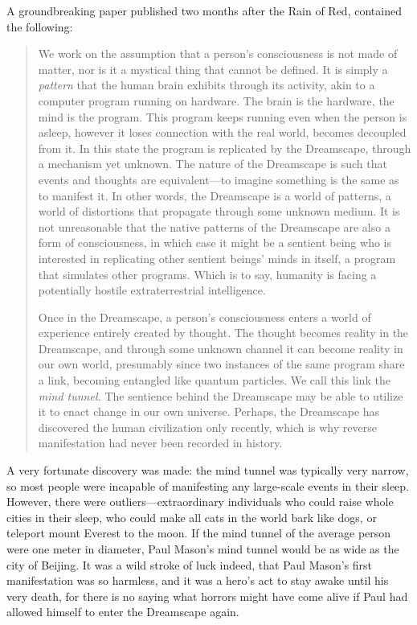 \documentclass[openany, oneside]{book}
\begin{document}
A groundbreaking paper published two months after the Rain of Red, contained the following:

\begin{quote}
  We work on the assumption that a person's consciousness is not made of matter, nor is it a mystical thing that cannot be defined.
  It is simply a \emph{pattern} that the human brain exhibits through its activity, akin to a computer program running on hardware.
  The brain is the hardware, the mind is the program.
  This program keeps running even when the person is asleep, however it loses connection with the real world, becomes decoupled from it.
  In this state the program is replicated by the Dreamscape, through a mechanism yet unknown.
  The nature of the Dreamscape is such that events and thoughts are equivalent---to imagine something is the same as to manifest it.
  In other words, the Dreamscape is a world of patterns, a world of distortions that propagate through some unknown medium.
  It is not unreasonable that the native patterns of the Dreamscape are also a form of consciousness, in which case it might be a sentient being who is interested in replicating other sentient beings' minds in itself, a program that simulates other programs.
  Which is to say, humanity is facing a potentially hostile extraterrestrial intelligence.

  Once in the Dreamscape, a person's consciousness enters a world of experience entirely created by thought.
  The thought becomes reality in the Dreamscape, and through some unknown channel it can become reality in our own world, presumably since two instances of the same program share a link, becoming entangled like quantum particles.
  We call this link the \emph{mind tunnel.}
  The sentience behind the Dreamscape may be able to utilize it to enact change in our own universe.
  Perhaps, the Dreamscape has discovered the human civilization only recently, which is why reverse manifestation had never been recorded in history.
\end{quote}

A very fortunate discovery was made: the mind tunnel was typically very narrow, so most people were incapable of manifesting any large-scale events in their sleep.
However, there were outliers---extraordinary individuals who could raise whole cities in their sleep, who could make all cats in the world bark like dogs, or teleport mount Everest to the moon.
If the mind tunnel of the average person were one meter in diameter, Paul Mason's mind tunnel would be as wide as the city of Beijing.
It was a wild stroke of luck indeed, that Paul Mason's first manifestation was so harmless, and it was a hero's act to stay awake until his very death, for there is no saying what horrors might have come alive if Paul had allowed himself to enter the Dreamscape again.\\
\end{document}
